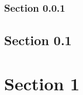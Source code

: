 \documentclass{article}
\begin{document}
\subsubsection{Section 0.0.1}
\subsection{Section 0.1}
\section{Section 1}
\end{document}
